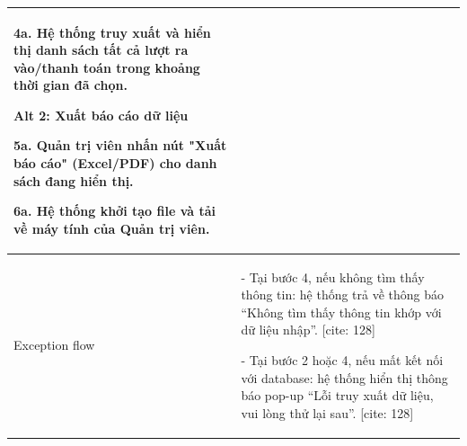\begin{center}
\begin{tabular}{|m{2.5cm}|m{13cm}|}
        4a. Hệ thống truy xuất và hiển thị danh sách tất cả lượt ra vào/thanh toán trong khoảng thời gian đã chọn.
        
        \textbf{Alt 2: Xuất báo cáo dữ liệu}
        
        5a. Quản trị viên nhấn nút "Xuất báo cáo" (Excel/PDF) cho danh sách đang hiển thị.
        
        6a. Hệ thống khởi tạo file và tải về máy tính của Quản trị viên. \\ 
    \hline
        Exception flow & 
        - Tại bước 4, nếu không tìm thấy thông tin: hệ thống trả về thông báo “Không tìm thấy thông tin khớp với dữ liệu nhập”. [cite: 128]
        
        - Tại bước 2 hoặc 4, nếu mất kết nối với database: hệ thống hiển thị thông báo pop-up “Lỗi truy xuất dữ liệu, vui lòng thử lại sau”. [cite: 128] \\
    \hline
    \end{tabular}
\end{center}